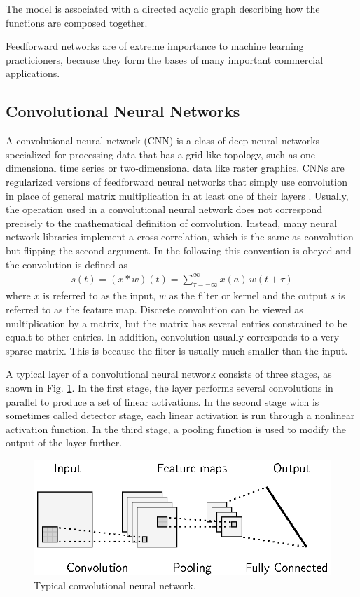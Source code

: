 \documentclass{scrartcl}
\begin{document}
The model is associated with a directed acyclic graph describing how the functions are composed together.

Feedforward networks are of extreme importance to machine learning practicioners, because they form the bases of many important commercial applications. 


\subsection{Convolutional Neural Networks}

A convolutional neural network (CNN) \cite{LeCun1989} is a class of deep neural networks specialized for processing data that has a grid-like topology, such as one-dimensional time series or two-dimensional data like raster graphics. CNNs are regularized versions of feedforward neural networks that simply use convolution in place of general matrix multiplication in at least one of their layers \cite{Goodfellow2016}. Usually, the operation used in a convolutional neural network does not correspond precisely to the mathematical definition of convolution. Instead, many neural network libraries implement a cross-correlation, which is the same as convolution but flipping the second argument. In the following this convention is obeyed and the convolution is defined as
\begin{align}
s(t) = (x * w)(t) = \sum_{\tau=-\infty}^{\infty} x(a)\,w(t+\tau)
\end{align} 
where $x$ is referred to as the input, $w$ as the filter or kernel and the output $s$ is referred to as the feature map. Discrete convolution can be viewed as multiplication by a matrix, but the matrix has several entries constrained to be equalt to other entries. In addition, convolution usually corresponds to a very sparse matrix. This is because the filter is usually much smaller than the input. 

A typical layer of a convolutional neural network consists of three stages, as shown in Fig. \ref{fig:typical_cnn}. In the first stage, the layer performs several convolutions in parallel to produce a set of linear activations. In the second stage wich is sometimes called detector stage, each linear activation is run through a nonlinear activation function. In the third stage, a pooling function is used to modify the output of the layer further. 

\begin{figure}[htbp]
\centering
\includegraphics[scale=1]{figures/cnn.eps}
\caption{Typical convolutional neural network. }
\label{fig:typical_cnn}
\end{figure}
\end{document}
